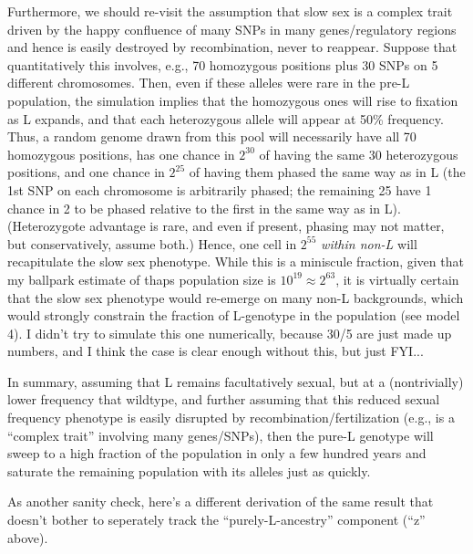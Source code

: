 \documentclass{article}\usepackage[]{graphicx}\usepackage[]{color}
\begin{document}
Furthermore, we should re-visit the assumption that slow sex is a complex trait driven by the happy
confluence of many SNPs in many genes/regulatory regions and hence is easily destroyed by
recombination, never to reappear.  Suppose that quantitatively this involves, e.g., 70 homozygous
positions plus 30 SNPs on 5 different chromosomes.  Then, even if these alleles were rare in the 
pre-L population, the simulation implies that the homozygous ones will rise to fixation as L
expands, and that each heterozygous allele will appear at 50\% frequency.   Thus, a random genome 
drawn from this pool will necessarily have all 70 homozygous positions, has one chance in $2^{30}$ of
having the same 30 heterozygous positions, and one chance in $2^{25}$ of having them phased the same
way as in L (the 1st SNP on each chromosome is arbitrarily phased; the remaining 25 have 1 chance in
2 to be phased relative to the first in the same way as in L).  (Heterozygote advantage is rare, and 
even if present, phasing may not matter, but conservatively, assume both.)  Hence, one cell in 
$2^{55}$ \textit{within non-L} will recapitulate the slow sex phenotype.  While this is a 
miniscule fraction, given that my ballpark estimate of thaps population size is 
$10^{19}\approx2^{63}$, it is virtually certain that the slow sex phenotype would re-emerge on 
many non-L backgrounds, which would strongly constrain the fraction of L-genotype in the 
population (see model 4).  I didn't try to simulate this one numerically, because 30/5 are just 
made up numbers, and I think the case is clear enough without this, but just FYI...

In summary, assuming that L remains facultatively sexual, but at a (nontrivially) lower frequency
that wildtype, and further assuming that this reduced sexual frequency phenotype is easily disrupted
by recombination/fertilization (e.g., is a ``complex trait'' involving many genes/SNPs), then the
pure-L genotype will sweep to a high fraction of the population in only a few hundred years and
saturate the remaining population with its alleles just as quickly.

As another sanity check, here's a different derivation of the same result that doesn't bother to
seperately track the ``purely-L-ancestry'' component (``z'' above).
\end{document}
